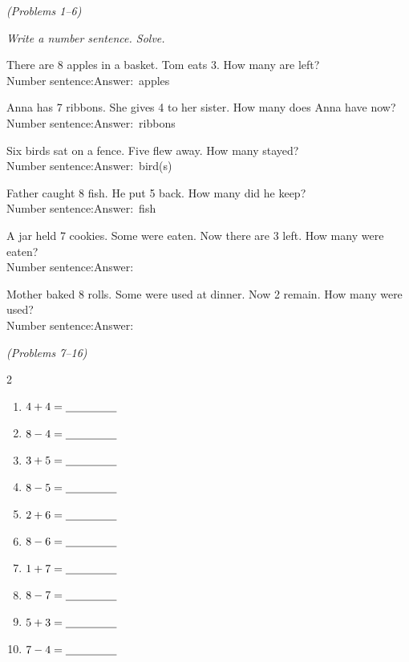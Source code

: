 \documentclass[12pt, letterpaper]{article}
\begin{document}
\bigskip
{} \hfill \textit{(Problems 1–6)}

\medskip\noindent\textit{Write a number sentence. Solve.}

\bigskip
\prob There are 8 apples in a basket. Tom eats 3. How many are left?\\[6pt]
\hspace{2em}Number sentence:\ansblanklg \quad Answer:\ansblank\ apples

\medskip
\prob Anna has 7 ribbons. She gives 4 to her sister. How many does Anna have now?\\[6pt]
\hspace{2em}Number sentence:\ansblanklg \quad Answer:\ansblank\ ribbons

\medskip
\prob Six birds sat on a fence. Five flew away. How many stayed?\\[6pt]
\hspace{2em}Number sentence:\ansblanklg \quad Answer:\ansblank\ bird(s)

\medskip
\prob Father caught 8 fish. He put 5 back. How many did he keep?\\[6pt]
\hspace{2em}Number sentence:\ansblanklg \quad Answer:\ansblank\ fish

\medskip
\prob A jar held 7 cookies. Some were eaten. Now there are 3 left. How many were eaten?\\[6pt]
\hspace{2em}Number sentence:\ansblanklg \quad Answer:\ansblank

\medskip
\prob Mother baked 8 rolls. Some were used at dinner. Now 2 remain. How many were used?\\[6pt]
\hspace{2em}Number sentence:\ansblanklg \quad Answer:\ansblank

\bigskip\bigskip
{} \hfill \textit{(Problems 7–16)}

\bigskip
\begin{multicols}{2}
\begin{enumerate}[leftmargin=*,label=\textbf{\arabic*.},itemsep=10pt,start=7]
  \item $4+4=\underline{\hspace{1.6cm}}$
  \item $8-4=\underline{\hspace{1.6cm}}$
  \item $3+5=\underline{\hspace{1.6cm}}$
  \item $8-5=\underline{\hspace{1.6cm}}$
  \item $2+6=\underline{\hspace{1.6cm}}$
  \item $8-6=\underline{\hspace{1.6cm}}$
  \item $1+7=\underline{\hspace{1.6cm}}$
  \item $8-7=\underline{\hspace{1.6cm}}$
  \item $5+3=\underline{\hspace{1.6cm}}$
  \item $7-4=\underline{\hspace{1.6cm}}$
\end{enumerate}
\end{multicols}
\end{document}
